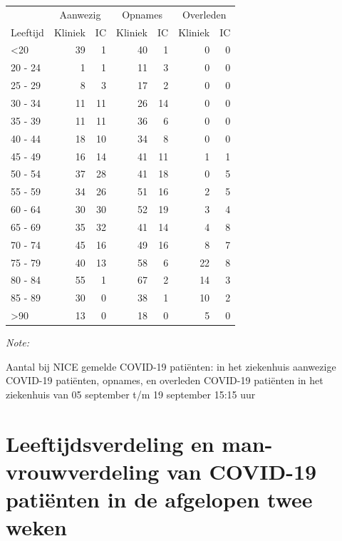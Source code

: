 \documentclass[
  english,
  man,floatsintext]{apa6}
\begin{document}
\begin{table}
\centering\begingroup\fontsize{10}{12}\selectfont

\begin{threeparttable}
\begin{tabular}{lrrrrrr}
\toprule
\multicolumn{1}{c}{ } & \multicolumn{2}{c}{Aanwezig} & \multicolumn{2}{c}{Opnames} & \multicolumn{2}{c}{Overleden} \\
\cmidrule(l{3pt}r{3pt}){2-3} \cmidrule(l{3pt}r{3pt}){4-5} \cmidrule(l{3pt}r{3pt}){6-7}
Leeftijd & Kliniek & IC & Kliniek & IC & Kliniek & IC\\
\midrule
<20 & 39 & 1 & 40 & 1 & 0 & 0\\
20 - 24 & 1 & 1 & 11 & 3 & 0 & 0\\
25 - 29 & 8 & 3 & 17 & 2 & 0 & 0\\
30 - 34 & 11 & 11 & 26 & 14 & 0 & 0\\
35 - 39 & 11 & 11 & 36 & 6 & 0 & 0\\
40 - 44 & 18 & 10 & 34 & 8 & 0 & 0\\
45 - 49 & 16 & 14 & 41 & 11 & 1 & 1\\
50 - 54 & 37 & 28 & 41 & 18 & 0 & 5\\
55 - 59 & 34 & 26 & 51 & 16 & 2 & 5\\
60 - 64 & 30 & 30 & 52 & 19 & 3 & 4\\
65 - 69 & 35 & 32 & 41 & 14 & 4 & 8\\
70 - 74 & 45 & 16 & 49 & 16 & 8 & 7\\
75 - 79 & 40 & 13 & 58 & 6 & 22 & 8\\
80 - 84 & 55 & 1 & 67 & 2 & 14 & 3\\
85 - 89 & 30 & 0 & 38 & 1 & 10 & 2\\
>90 & 13 & 0 & 18 & 0 & 5 & 0\\
\bottomrule
\end{tabular}
\begin{tablenotes}
\item \textit{Note: } 
\item Aantal bij NICE gemelde COVID-19 patiënten: in het ziekenhuis aanwezige COVID-19 patiënten, opnames, en overleden COVID-19 patiënten in het ziekenhuis van 05 september t/m 19 september 15:15 uur
\end{tablenotes}
\end{threeparttable}
\endgroup{}
\end{table}

\newpage

\hypertarget{leeftijdsverdeling-en-man-vrouwverdeling-van-covid-19-patiuxebnten-in-de-afgelopen-twee-weken}{%
\section{Leeftijdsverdeling en man-vrouwverdeling van COVID-19 patiënten in de afgelopen twee weken}\label{leeftijdsverdeling-en-man-vrouwverdeling-van-covid-19-patiuxebnten-in-de-afgelopen-twee-weken}}
\end{document}
